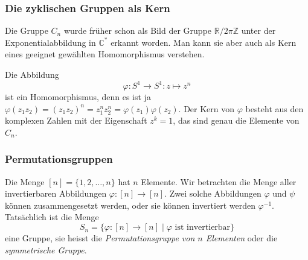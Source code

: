 %
%
\subsubsection{Die zyklischen Gruppen als Kern}
Die Gruppe $C_n$ wurde früher schon als Bild der Gruppe
$\mathbb{R}/2\pi\mathbb{Z}$ unter der Exponentialabbildung 
in $\mathbb{C}^*$ erkannt worden.
Man kann sie aber auch als Kern eines geeignet gewählten Homomorphismus
verstehen.

Die Abbildung
\[
\varphi
\colon
S^1\to S^1
:
z\mapsto z^n
\]
ist ein Homomorphismus, denn es ist ja $\varphi(z_1z_2)=(z_1z_2)^n
= z_1^nz_2^n=\varphi(z_1)\varphi(z_2)$.
Der Kern von $\varphi$ besteht aus den komplexen Zahlen mit der 
Eigenschaft $z^k=1$, das sind genau die Elemente von $C_n$.

%
%
\subsubsection{Permutationsgruppen}
Die Menge $[n]=\{1,2,\dots,n\}$ hat $n$ Elemente.
Wir betrachten die Menge aller invertierbaren Abbildungen
$\varphi\colon [n] \to [n]$.
Zwei solche Abbildungen $\varphi$ und $\psi$ können zusammengesetzt
werden, oder sie können invertiert werden $\varphi^{-1}$.
Tatsächlich ist die Menge 
\[
S_n = \{\varphi\colon [n] \to [n]\mid \text{$\varphi$ ist invertierbar} \}
\]
eine Gruppe, sie heisst die {\em Permutationsgruppe von $n$ Elementen}
oder die {\em symmetrische Gruppe}.

